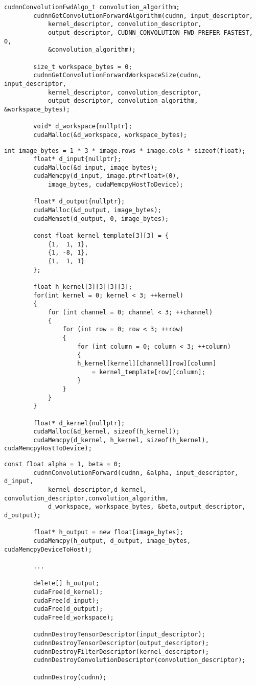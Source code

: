 		\begin{lstlisting}[caption=cuDNN: Konvolutions-Algorithmus]
		cudnnConvolutionFwdAlgo_t convolution_algorithm;
		cudnnGetConvolutionForwardAlgorithm(cudnn, input_descriptor, 
			kernel_descriptor, convolution_descriptor, 
			output_descriptor, CUDNN_CONVOLUTION_FWD_PREFER_FASTEST, 0, 
			&convolution_algorithm);

		size_t workspace_bytes = 0;
		cudnnGetConvolutionForwardWorkspaceSize(cudnn, input_descriptor, 
			kernel_descriptor, convolution_descriptor,
			output_descriptor, convolution_algorithm, &workspace_bytes);

		void* d_workspace{nullptr};
		cudaMalloc(&d_workspace, workspace_bytes);
		\end{lstlisting}

		\begin{lstlisting}[caption=cuDNN: Kernel]
		int image_bytes = 1 * 3 * image.rows * image.cols * sizeof(float);
		float* d_input{nullptr};
		cudaMalloc(&d_input, image_bytes);
		cudaMemcpy(d_input, image.ptr<float>(0), 
			image_bytes, cudaMemcpyHostToDevice);

		float* d_output{nullptr};
		cudaMalloc(&d_output, image_bytes);
		cudaMemset(d_output, 0, image_bytes);

		const float kernel_template[3][3] = {
			{1,  1, 1},
			{1, -8, 1},
			{1,  1, 1}
		};

		float h_kernel[3][3][3][3];
		for(int kernel = 0; kernel < 3; ++kernel)
		{
			for (int channel = 0; channel < 3; ++channel)
			{
				for (int row = 0; row < 3; ++row) 
				{
					for (int column = 0; column < 3; ++column)
					{
					h_kernel[kernel][channel][row][column] 
						= kernel_template[row][column];
					}
				}
			}
		}

		float* d_kernel{nullptr};
		cudaMalloc(&d_kernel, sizeof(h_kernel));
		cudaMemcpy(d_kernel, h_kernel, sizeof(h_kernel), cudaMemcpyHostToDevice);
    	\end{lstlisting}
    	
    	\begin{lstlisting}[caption=cuDNN: feed forward]
		const float alpha = 1, beta = 0;
		cudnnConvolutionForward(cudnn, &alpha, input_descriptor, d_input,
			kernel_descriptor,d_kernel, convolution_descriptor,convolution_algorithm,
			d_workspace, workspace_bytes, &beta,output_descriptor, d_output);

		float* h_output = new float[image_bytes];
		cudaMemcpy(h_output, d_output, image_bytes, cudaMemcpyDeviceToHost);

		...

		delete[] h_output;
		cudaFree(d_kernel);
		cudaFree(d_input);
		cudaFree(d_output);
		cudaFree(d_workspace);

		cudnnDestroyTensorDescriptor(input_descriptor);
		cudnnDestroyTensorDescriptor(output_descriptor);
		cudnnDestroyFilterDescriptor(kernel_descriptor);
		cudnnDestroyConvolutionDescriptor(convolution_descriptor);

		cudnnDestroy(cudnn);
    	\end{lstlisting}

